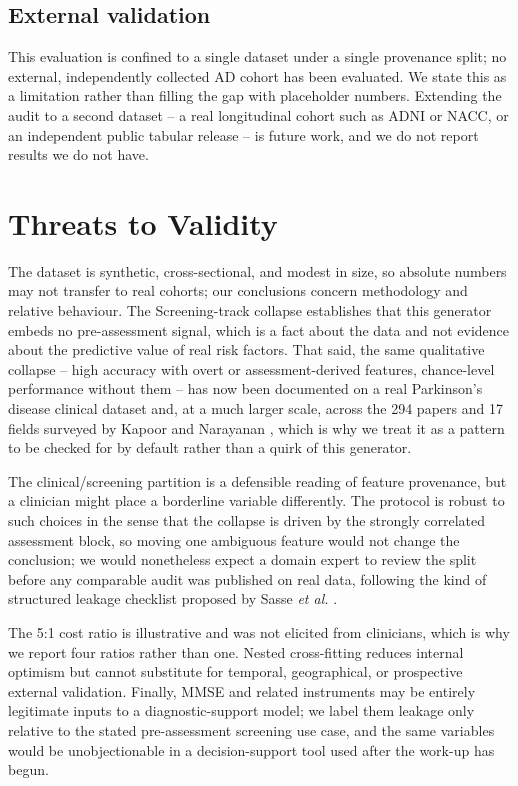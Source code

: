 \documentclass[conference]{IEEEtran}
\begin{document}
\subsection{External validation}
This evaluation is confined to a single dataset under a single provenance split; no external, independently collected AD cohort has been evaluated. We state this as a limitation rather than filling the gap with placeholder numbers. Extending the audit to a second dataset -- a real longitudinal cohort such as ADNI or NACC, or an independent public tabular release -- is future work, and we do not report results we do not have.

\section{Threats to Validity}
The dataset is synthetic, cross-sectional, and modest in size, so absolute numbers may not transfer to real cohorts; our conclusions concern methodology and relative behaviour. The Screening-track collapse establishes that this generator embeds no pre-assessment signal, which is a fact about the data and not evidence about the predictive value of real risk factors. That said, the same qualitative collapse -- high accuracy with overt or assessment-derived features, chance-level performance without them -- has now been documented on a real Parkinson's disease clinical dataset \cite{b42} and, at a much larger scale, across the 294 papers and 17 fields surveyed by Kapoor and Narayanan \cite{b40}, which is why we treat it as a pattern to be checked for by default rather than a quirk of this generator.

The clinical/screening partition is a defensible reading of feature provenance, but a clinician might place a borderline variable differently. The protocol is robust to such choices in the sense that the collapse is driven by the strongly correlated assessment block, so moving one ambiguous feature would not change the conclusion; we would nonetheless expect a domain expert to review the split before any comparable audit was published on real data, following the kind of structured leakage checklist proposed by Sasse \textit{et al.} \cite{b41}.

The 5:1 cost ratio is illustrative and was not elicited from clinicians, which is why we report four ratios rather than one. Nested cross-fitting reduces internal optimism but cannot substitute for temporal, geographical, or prospective external validation. Finally, MMSE and related instruments may be entirely legitimate inputs to a diagnostic-support model; we label them leakage only relative to the stated pre-assessment screening use case, and the same variables would be unobjectionable in a decision-support tool used after the work-up has begun.
\end{document}
